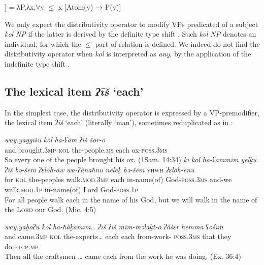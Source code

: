 \documentclass[output=paper]{langsci/langscibook}
\begin{document}
\ea%
    \label{ex:doron:45}\relax
    [[each]]  =   λP.λx.${\forall}$y ${\leq}$ x [Atom(y) → P(y)]
\z


We only expect the distributivity operator to modify VPs predicated of a subject \textit{kol} \textit{NP} if the latter is derived by the definite type shift . Such \textit{kol} \textit{NP} denotes an individual, for which the ${\leq}$  part-of relation is defined. We indeed do not find the distributivity operator when \textit{kol} is interpreted as \textit{any}, by the application of the indefinite type shift .  

\subsection{The lexical item \textit{ʔīš} ‘each’}%
In the simplest case, the distributivity operator is expressed by a VP-premodifier, the lexical item \textit{ʔīš} ‘each’ (literally ‘man’), sometimes reduplicated as in :

\ea%
    \label{ex:doron:46}
    \ea
    \gll \textit{way.yaggīšū}          \textit{kol}    \textit{hā-ʕām}              \textit{ʔīš}     \textit{šōr-ō}                  \\
         and.brought\textsc{.3mp}   \textsc{kol} the-people.\textsc{ms}   each  ox-\textsc{poss.3ms}   \\
    \glt So every one of the people brought his ox.  (1Sam. 14:34)
    \ex  
    \gll \textit{kī}   \textit{kol}    \textit{hā-ʕammim}   \textit{yēlḵū}                   \textit{ʔīš}      \textit{bə-šēm}         \textit{ʔɛlōh-āw} \textit{wa-ʔănaħnū} \textit{nēlēḵ}                \textit{bə-šēm}        \textsc{yhwh}  \textit{ʔɛlōh-ēnū}\\
         for \textsc{kol}   the-peoples   walk.\textsc{mod.3mp}   each   in-name(of)  God-\textsc{poss.3ms} and-we         walk.\textsc{mod.1p}   in-name(of) Lord   God-\textsc{poss.1p}\\
    \glt For all people walk each in the name of his God, but we will walk in the name of the \textsc{Lord} our God. (Mic. 4:5)
    \z
\z


\ea%
    \label{ex:doron:47}
    \gll \textit{way.yāḇōʔū}      \textit{kol}   \textit{ha-ħăḵāmīm…} \textit{ʔīš}     \textit{ʔīš}    \textit{mim-məlaḵt-ō}             \textit{ʔăšɛr}  \textit{hēmmā}  \textit{ʕōśīm}\\
         and.came\textsc{.3mp}  \textsc{kol} the-experts…   each each from-work- \textsc{poss.3ms} that    they       do.\textsc{ptcp.mp}\\
    \glt Then all the craftsmen … came each from the work he was doing. (Ex. 36:4)
    \z
\end{document}
